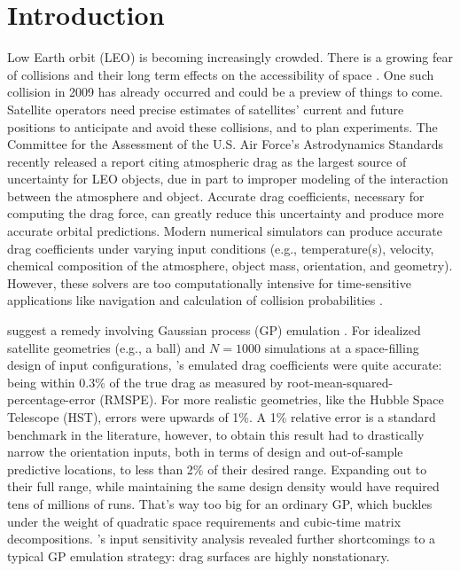 \documentclass[12pt]{article}
\begin{document}

\section{Introduction}
\label{sec:intro}

Low Earth orbit (LEO) is becoming increasingly crowded. There is 
a growing fear of collisions and their long term effects on the accessibility
of space \citep{kessler:cour:1978}. One such collision in 2009
\citep{achenbach:2009} has already occurred and could be a preview of things
to come. Satellite operators need precise estimates of satellites' current and
future positions to anticipate and avoid these collisions, and to plan
experiments. The Committee for the Assessment of the U.S. Air Force’s
Astrodynamics Standards recently released a report citing atmospheric drag as
the largest source of uncertainty for LEO objects, due in part to improper
modeling of the interaction between the atmosphere and object. Accurate drag
coefficients, necessary for computing the drag force, can greatly reduce this
uncertainty and produce more accurate orbital predictions. Modern numerical
simulators can produce accurate drag coefficients under varying input
conditions (e.g., temperature(s), velocity, chemical composition of the
atmosphere, object mass, orientation, and geometry). However, these solvers
are too computationally intensive for time-sensitive applications like
navigation and calculation of collision probabilities
\citep{lawrence:etal:2014}.

\citet{metha:etal:2014} suggest a remedy involving Gaussian process (GP)
emulation \citep{sack:welc:mitc:wynn:1989,sant:will:notz:2003}. For idealized
satellite geometries (e.g., a ball) and $N=1000$ simulations at a
space-filling design of input configurations, \citet{metha:etal:2014}'s
emulated drag coefficients were quite accurate: being within 0.3\% of the true
drag as measured by root-mean-squared-percentage-error (RMSPE). For more
realistic geometries, like the Hubble Space Telescope (HST), errors were
upwards of 1\%.  A 1\% relative error is a standard benchmark in the
literature, however, to obtain this result \citet{metha:etal:2014} had to
drastically narrow the orientation inputs, both in terms of design and
out-of-sample predictive locations, to less than 2\% of their desired range.
Expanding out to their full range, while maintaining the same design density
would have required tens of millions of runs.  That's way too big for an
ordinary GP, which buckles under the weight of quadratic space requirements
and cubic-time matrix decompositions. \citet{metha:etal:2014}'s input
sensitivity analysis revealed further shortcomings to a typical GP emulation
strategy: drag surfaces are highly nonstationary.
\end{document}
